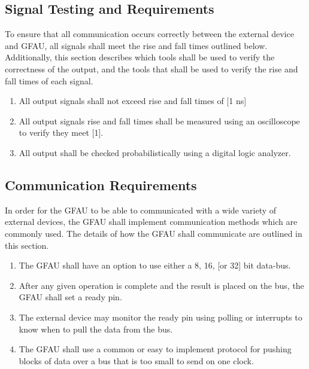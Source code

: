 \documentclass[paper=usletter, fontsize=14pt]{article}
\begin{document}
        \subsection{Signal Testing and Requirements}
        To ensure that all communication occurs correctly between the external device and GFAU, all signals shall meet the rise and fall times outlined below. Additionally, this section describes which tools shall be used to verify the correctness of the output, and the tools that shall be used to verify the rise and fall times of each signal.

        \begin{enumerate}

            \item All output signals shall not exceed rise and fall times of [1 ns]
            
            \item All output signals rise and fall times shall be measured using an oscilloscope to verify they meet [1].
            
            \item All output shall be checked probabilistically using a digital logic analyzer.

        \end{enumerate}

        \subsection{Communication Requirements}
        In order for the GFAU to be able to communicated with a wide variety of external devices, the GFAU shall implement communication methods which are commonly used. The details of how the GFAU shall communicate are outlined in this section.

        \begin{enumerate}
            
            \item The GFAU shall have an option to use either a 8, 16, [or 32] bit data-bus.
            
            \item After any given operation is complete and the result is placed on the bus, the GFAU shall set a ready pin. 
            
            \item The external device may monitor the ready pin using polling or interrupts to know when to pull the data from the bus.
            
            \item The GFAU shall use a common or easy to implement protocol for pushing blocks of data over a bus that is too small to send on one clock.

        \end{enumerate}
\end{document}
